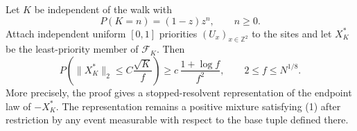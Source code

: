 \begin{lemma}\label{lem:plateau-bijection}
Let \(K\) be independent of the walk with
\[
       P(K=n)=(1-z)z^n,\qquad n\ge0.
\]
Attach independent uniform $[0,1]$ priorities \((U_x)_{x\in\mathbb Z^2}\) to
the sites and let \(X_K^*\) be the least-priority member of
\(\mathcal F_K\). Then
\begin{equation}
P\left(\lVert X_K^*\rVert_2\le C\frac{\sqrt K}{f}\right)
       \ge c\,\frac{1+\log f}{f^2},\qquad
       2\le f\le N^{1/8}.                                     \tag{5}
\end{equation}
More precisely, the proof gives a stopped-resolvent representation of the
endpoint law of \(-X_K^*\). The representation remains a positive mixture
satisfying (1) after restriction by any event measurable with respect to
the base tuple defined there.
\end{lemma}

